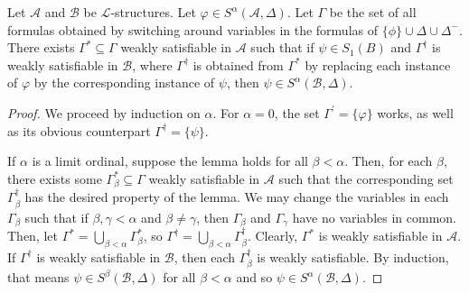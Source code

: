 \documentclass{article}
\let\mc\mathcal
\begin{document}
\begin{lemma}\label{gStar}
    Let $\mc{A}$ and $\mc{B}$ be $\mc{L}$-structures. Let $\varphi \in S^{\alpha}(\mc{A}, \Delta)$. Let $\Gamma$ be the set of all formulas obtained by switching around variables in the formulas of $\{ \phi \} \cup \Delta \cup \Delta^{-}$. There exists $\Gamma^{\ast} \subseteq \Gamma$ weakly satisfiable in $\mc{A}$ such that if $\psi \in S_1(B)$ and $\Gamma^{\dagger}$ is weakly satisfiable in $\mc{B}$, where $\Gamma^{\dagger}$ is obtained from $\Gamma^{\ast}$ by replacing each instance of $\varphi$ by the corresponding instance of $\psi$, then $\psi \in S^{\alpha}(\mc{B}, \Delta)$.
\end{lemma}
\begin{proof}
    We proceed by induction on $\alpha$. For $\alpha = 0$, the set $\Gamma^{\prime} = \{ \varphi \}$ works, as well as its obvious counterpart $\Gamma^{\dagger} = \{ \psi \}$. 
    
    If $\alpha$ is a limit ordinal, suppose the lemma holds for all $\beta < \alpha$. Then, for each $\beta$, there exists some $\Gamma_{\beta}^{\ast} \subseteq \Gamma$ weakly satisfiable in $\mc{A}$ such that the corresponding set $\Gamma_{\beta}^{\dagger}$ has the desired property of the lemma. We may change the variables in each $\Gamma_{\beta}$ such that if $\beta, \gamma < \alpha$ and $\beta \neq \gamma$, then $\Gamma_{\beta}$ and $\Gamma_{\gamma}$ have no variables in common. Then, let $\Gamma^{\ast} = \bigcup_{\beta < \alpha} \Gamma_{\beta}^{\ast}$, so $\Gamma^{\dagger} = \bigcup_{\beta < \alpha} \Gamma_{\beta}^{\dagger}$. Clearly, $\Gamma^{\ast}$ is weakly satisfiable in $\mc{A}$. If $\Gamma^{\dagger}$ is weakly satisfiable in $\mc{B}$, then each $\Gamma_{\beta}^{\dagger}$ is weakly satisfiable. By induction, that means $\psi \in S^{\beta}(\mc{B}, \Delta)$ for all $\beta < \alpha$ and so $\psi \in S^{\alpha}(\mc{B}, \Delta)$.


\end{proof}
\end{document}
